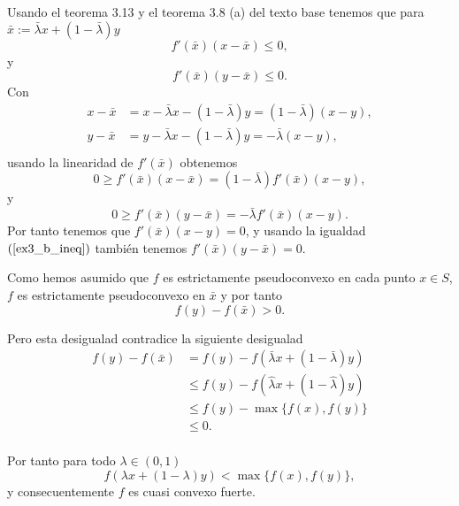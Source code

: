 Usando el teorema 3.13 y el teorema 3.8 (a) del texto base tenemos que para $\bar{x} := \bar{\lambda} x + (1 - \bar{\lambda}) y$
\begin{equation*}
    f'(\bar{x})(x - \bar{x}) \leq 0,
\end{equation*}
y
\begin{equation*}
    f'(\bar{x})(y - \bar{x}) \leq 0.
\end{equation*}
Con
\begin{equation}\label{ex3_b_ineq}
\begin{aligned}
    x - \bar{x} & = x - \bar{\lambda} x - (1 - \bar{\lambda}) y = (1 - \bar{\lambda}) (x - y), \\
    y - \bar{x} & = y - \bar{\lambda} x - (1 - \bar{\lambda}) y = - \bar{\lambda} (x - y), \\
\end{aligned}
\end{equation}
usando la linearidad de $f'(\bar{x})$ obtenemos
\begin{equation*}
    0 \geq f'(\bar{x})(x - \bar{x}) = (1 - \bar{\lambda}) f'(\bar{x}) (x - y),
\end{equation*}
y
\begin{equation*}
    0 \geq f'(\bar{x})(y - \bar{x}) = - \bar{\lambda} f'(\bar{x}) (x - y).
\end{equation*}
Por tanto tenemos que $f'(\bar{x})(x - y) = 0$,
y usando la igualdad $(\ref{ex3_b_ineq})$ también tenemos $f'(\bar{x})(y - \bar{x}) = 0$.

Como hemos asumido que $f$ es estrictamente pseudoconvexo en cada punto $x \in S$,
$f$ es estrictamente pseudoconvexo en $\bar{x}$ y por tanto
\begin{equation*}
    f(y) - f(\bar{x}) > 0.
\end{equation*}

Pero esta desigualad contradice la siguiente desigualad
\begin{equation*}
\begin{aligned}
    f(y) - f(\bar{x})
        & = f(y) - f(\bar{\lambda} x + (1 - \bar{\lambda}) y) \\
        & \leq f(y) - f(\hat{\lambda} x + (1 - \hat{\lambda}) y) \\
        & \leq f(y) - \max \{ f(x), f(y) \} \\
        & \leq 0. \\
\end{aligned}
\end{equation*}

Por tanto para todo $\lambda \in (0,1)$
\begin{equation*}
    f(\lambda x + (1 - \lambda) y) < \max \{ f(x), f(y) \},
\end{equation*}
y consecuentemente $f$ es cuasi convexo fuerte.
